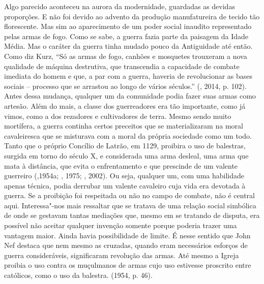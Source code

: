 Algo parecido aconteceu na aurora da modernidade, guardadas as devidas
proporções. E não foi devido ao advento da produção manufatureira de
tecido tão florescente. Mas sim ao aparecimento de um poder social
inaudito representado pelas armas de fogo. Como se sabe, a guerra fazia
parte da paisagem da Idade Média. Mas o caráter da guerra tinha mudado
pouco da Antiguidade até então. Como diz Kurz, ``Só as armas de fogo,
canhões e mosquetes trouxeram a nova qualidade de máquina destrutiva,
que transcendia a capacidade de combate imediata do homem e que, a par
com a guerra, haveria de revolucionar as bases sociais -- processo que
se arrastou ao longo de vários séculos.'' (, 2014, p. 102). Antes
dessa mudança, qualquer um da comunidade podia fazer suas armas como
artesão. Além do mais, a classe dos guerreadores era tão importante,
como já vimos, como a dos rezadores e cultivadores de terra. Mesmo sendo
muito mortífera, a guerra continha certos preceitos que se
materializaram na moral cavaleiresca que se misturava com a moral da
própria sociedade como um todo. Tanto que o próprio Concílio de Latrão,
em 1129, proibira o uso de balestras, surgida em torno do século X, e
considerada uma arma desleal, uma arma que mata à distância, que evita o
enfrentamento e que prescinde de um valente guerreiro (,1954a;
, 1975; , 2002). Ou seja, qualquer um, com uma habilidade
apenas técnica, podia derrubar um valente cavaleiro cuja vida era
devotada à guerra. Se a proibição foi respeitada ou não no campo de
combate, não é central aqui. Interessa"-nos mais ressaltar que se tratava
de uma relação social simbólica de onde se gestavam tantas mediações
que, mesmo em se tratando de disputa, era possível não aceitar qualquer
invenção somente porque poderia trazer uma vantagem maior. Ainda havia
possibilidade de limite. É nesse sentido que John Nef destaca que nem
mesmo as cruzadas, quando eram necessários esforços de guerra
consideráveis, significaram revolução das armas. Até mesmo a Igreja
proibia o uso contra os muçulmanos de armas cujo uso estivesse proscrito
entre católicos, como o uso da balestra. (1954, p. 46).

